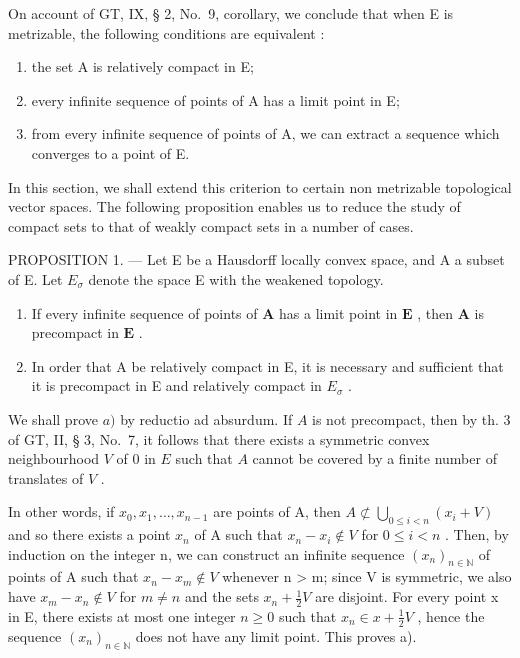 On account of GT, IX, § 2, No.~9, corollary, we conclude that when E is metrizable, the following conditions are equivalent :

\begin{enumerate}
\def\labelenumi{\alph{enumi})}
\item
  the set A is relatively compact in E;
\item
  every infinite sequence of points of A has a limit point in E;
\item
  from every infinite sequence of points of A, we can extract a sequence which converges to a point of E.
\end{enumerate}

In this section, we shall extend this criterion to certain non metrizable topological vector spaces. The following proposition enables us to reduce the study of compact sets to that of weakly compact sets in a number of cases.

PROPOSITION 1. --- Let E be a Hausdorff locally convex space, and A a subset of E. Let \(E_{\sigma}\) denote the space E with the weakened topology.

\begin{enumerate}
\def\labelenumi{\alph{enumi})}
\item
  If every infinite sequence of points of \(\mathbf{A}\) has a limit point in \(\mathbf{E}\) , then \(\mathbf{A}\) is precompact in \(\mathbf{E}\) .
\item
  In order that A be relatively compact in E, it is necessary and sufficient that it is precompact in E and relatively compact in \(E_{\sigma}\) .
\end{enumerate}

We shall prove \(a)\) by reductio ad absurdum. If \(A\) is not precompact, then by th. 3 of GT, II, § 3, No.~7, it follows that there exists a symmetric convex neighbourhood \(V\) of 0 in \(E\) such that \(A\) cannot be covered by a finite number of translates of \(V\) .

In other words, if \(x_{0}, x_{1}, \ldots, x_{n-1}\) are points of A, then \(A \not\subset \bigcup_{0 \leqslant i < n} (x_{i} + V)\) and so there exists a point \(x_{n}\) of A such that \(x_{n} - x_{i} \notin V\) for \(0 \leqslant i < n\) . Then, by induction on the integer n, we can construct an infinite sequence \((x_{n})_{n \in \mathbb{N}}\) of points of A such that \(x_{n} - x_{m} \notin V\) whenever n \textgreater{} m; since V is symmetric, we also have \(x_{m} - x_{n} \notin V\) for \(m \neq n\) and the sets \(x_{n} + \frac{1}{2}V\) are disjoint. For every point x in E, there exists at most one integer \(n \geqslant 0\) such that \(x_{n} \in x + \frac{1}{2}V\) , hence the sequence \((x_{n})_{n \in \mathbb{N}}\) does not have any limit point. This proves a).


